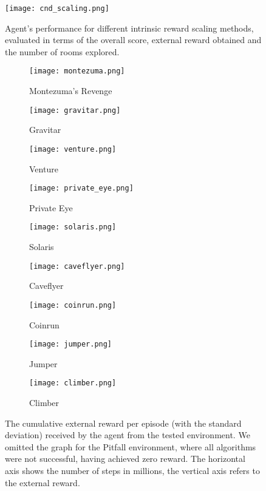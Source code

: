 \documentclass[a4paper,11pt]{elsarticle}
\begin{document}
\begin{figure*}[t!]
\centering
\texttt{[image: cnd\_scaling.png]}
\caption{Agent's performance for different intrinsic reward scaling methods, evaluated in terms of the overall score, external reward obtained and the number of rooms explored.}
\label{img:result_cnd_scaling}
\end{figure*}

\begin{figure}[t!]
  \centering
  \begin{subfigure}[b]{0.32\textwidth}
    \centering
    \texttt{[image: montezuma.png]}
    \caption{Montezuma's Revenge}
    \label{fig:res2a}
  \end{subfigure}
  \begin{subfigure}[b]{0.32\textwidth}
    \centering
    \texttt{[image: gravitar.png]}
    \caption{Gravitar}
    \label{fig:res2b}
  \end{subfigure}  
  \begin{subfigure}[b]{0.32\textwidth}
    \centering
    \texttt{[image: venture.png]}
    \caption{Venture}
    \label{fig:res2c}
  \end{subfigure}
  \begin{subfigure}[b]{0.32\textwidth}
    \centering
    \texttt{[image: private\_eye.png]}
    \caption{Private Eye}
    \label{fig:res2d}
  \end{subfigure} 
  \begin{subfigure}[b]{0.32\textwidth}
    \centering
    \texttt{[image: solaris.png]}
    \caption{Solaris}
    \label{fig:res2f}
  \end{subfigure}
    \begin{subfigure}[b]{0.32\textwidth}
    \centering
    \texttt{[image: caveflyer.png]}
    \caption{Caveflyer}
    \label{fig:res2g}
  \end{subfigure}
    \begin{subfigure}[b]{0.32\textwidth}
    \centering
    \texttt{[image: coinrun.png]}
    \caption{Coinrun}
    \label{fig:res2h}
  \end{subfigure}
    \begin{subfigure}[b]{0.32\textwidth}
    \centering
    \texttt{[image: jumper.png]}
    \caption{Jumper}
    \label{fig:res2i}
  \end{subfigure}
    \begin{subfigure}[b]{0.32\textwidth}
    \centering
    \texttt{[image: climber.png]}
    \caption{Climber}
    \label{fig:res2j}
  \end{subfigure}
\caption{The cumulative external reward per episode (with the standard deviation) received by the agent from the tested environment. We omitted the graph for the Pitfall environment, where all algorithms were not successful, having achieved zero reward. The horizontal axis shows the number of steps in millions, the vertical axis refers to the external reward.}
\label{fig:result}
\end{figure}
\end{document}
